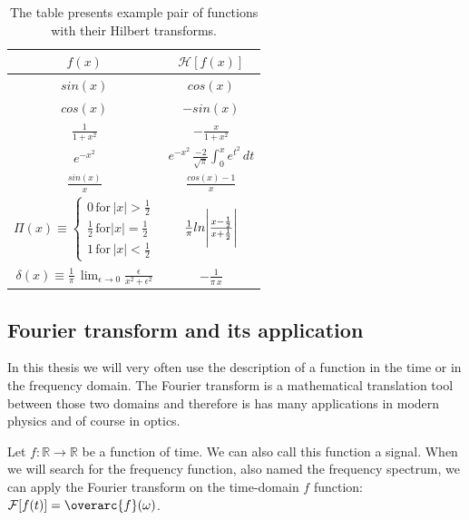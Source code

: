 \documentclass[12pt,twoside,a4paper]{article}
\numberwithin{equation}{subsection}
\numberwithin{figure}{subsection}
\begin{document}
\begin{table} 
  \centering
  \begin{tabular}{c | c}
    \hline \hline    
      $ f(x) $             & $ \mathcal{H}[f(x)] $ \\ 
    \hline \hline 
      $ sin(x) $           & $ cos(x) $ \\ 
    \hline
      $ cos(x) $           & $ - sin(x) $ \\ 
    \hline
      $ \frac{1}{1+x^2} $  & $ - \frac{x}{1 + x^2} $ \\ 
    \hline
      $ e^{-x^2} $         & $ e^{-x^2} \, \frac{ - 2 }{\sqrt{\pi}} \int_{0}^{x} e^{t^2} \, dt$ \\ 
    \hline
      $ \frac{sin(x)}{x} $ & $ \frac{cos(x)-1}{x} $ \\ 
    \hline
      $ \Pi(x) \equiv %
      \begin{cases} 
       0 \, \text{for}\, |x| > \frac{1}{2} \\
       \frac{1}{2}\, \text{for} |x| = \frac{1}{2} \\
       1\, \text{for}\, |x| < \frac{1}{2}
      \end{cases}        $ & $ \frac{1}{\pi} ln \Bigg{|} \frac{x - \frac{1}{2}}{x + \frac{1}{2}} \Bigg{|}  $ \\ 
    \hline
      $ \delta(x) \equiv \frac{1}{\pi} \, \lim_{\epsilon \to 0} \frac{\epsilon}{x ^ 2 + \epsilon ^ 2} 
                         $ & $ - \frac{1}{\pi \, x} $ \\
    \hline  
  \end{tabular} 
  \caption{The table presents example pair of functions with their Hilbert transforms.}
  \label{tab:mathematical_hexample}
\end{table}

\subsection{Fourier transform and its application}
 
In this thesis we will very often use the description of a function in the time or in the frequency domain. The Fourier transform is a mathematical translation tool between those two domains and therefore is has many applications in modern physics and of course in optics.

Let $f : \mathbb{R} \to \mathbb{R} $ be a function of time. We can also call this function a signal. When we will search for the frequency function, also named the frequency spectrum, we can apply the Fourier transform on the time-domain $ f $ function: $ \mathcal{F}[f(t)] =  \overarc{f}(\omega) $.
\end{document}
